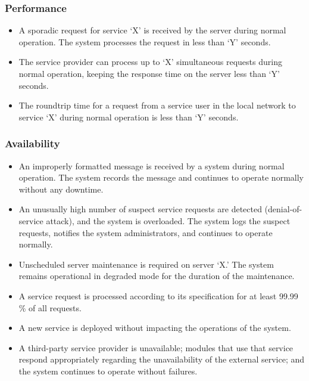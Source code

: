 \subsubsection{Performance}
\begin{itemize}
    \item A sporadic request for service ‘X’ is received by the server during normal operation. The system processes the request in less than ‘Y’ seconds. 
    \item The service provider can process up to ‘X’ simultaneous requests during normal operation, keeping the response time on the server less than ‘Y’ seconds.  
    \item The roundtrip time for a request from a service user in the local network to service ‘X’ during normal operation is less than ‘Y’ seconds. 
\end{itemize}

\subsubsection{Availability}
\begin{itemize}
    \item An improperly formatted message is received by a system during normal operation. The 
system records the message and continues to operate normally without any downtime. 
    \item An unusually high number of suspect service requests are detected (denial-of-service attack), and the system is overloaded. The system logs the suspect requests, notifies the system administrators, and continues to operate normally. 
    \item Unscheduled server maintenance is required on server ‘X.’ The system remains operational in degraded mode for the duration of the maintenance. 
    \item A service request is processed according to its specification for at least 99.99\,\% of all requests. 
    \item A new service is deployed without impacting the operations of the system. 
    \item A third-party service provider is unavailable; modules that use that service respond appropriately regarding the unavailability of the external service; and the system continues to operate without failures.
\end{itemize}


